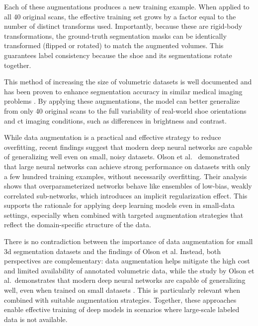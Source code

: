Each of these augmentations produces a new training example. When applied to all 40 original scans, the effective training set grows by a factor equal to the number of distinct transforms used. Importantly, because these are rigid-body transformations, the ground-truth segmentation masks can be identically transformed (flipped or rotated) to match the augmented volumes. This guarantees label consistency because the shoe and its segmentations rotate together. 

\medskip

This method of increasing the size of volumetric datasets is well documented and has been proven to enhance segmentation accuracy in similar medical imaging problems \cite{HaoDataAugmentation, AlomarDataAugmentation, SutassananonDataAugmentation}. By applying these augmentations, the model can better generalize from only 40 original scans to the full variability of real-world shoe orientations and \gls{ct} imaging conditions, such as differences in brightness and contrast.

\medskip

While data augmentation is a practical and effective strategy to reduce overfitting, recent findings suggest that modern deep neural networks are capable of generalizing well even on small, noisy datasets. Olson et al.~\cite{NEURIPS2018_fface838} demonstrated that large neural networks can achieve strong performance on datasets with only a few hundred training examples, without necessarily overfitting. Their analysis shows that overparameterized networks behave like ensembles of low-bias, weakly correlated sub-networks, which introduces an implicit regularization effect. This supports the rationale for applying deep learning models even in small-data settings, especially when combined with targeted augmentation strategies that reflect the domain-specific structure of the data.

\medskip

There is no contradiction between the importance of data augmentation for small \gls{3d} segmentation datasets and the findings of Olson et al. Instead, both perspectives are complementary: data augmentation helps mitigate the high cost and limited availability of annotated volumetric data, while the study by Olson et al.~demonstrates that modern deep neural networks are capable of generalizing well, even when trained on small datasets \cite{NEURIPS2018_fface838}. This is particularly relevant when combined with suitable augmentation strategies. Together, these approaches enable effective training of deep models in scenarios where large-scale labeled data is not available.


